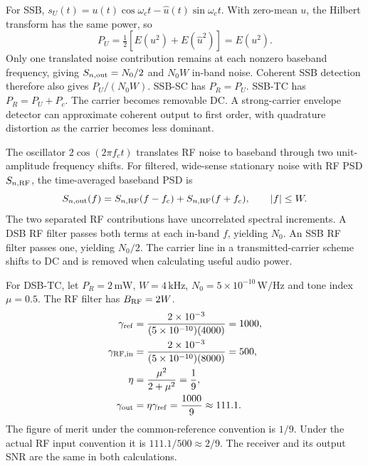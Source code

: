 \documentclass[12pt,a4paper]{article}
\begin{document}
For SSB, $s_U(t)=u(t)\cos\omega_ct-\widehat u(t)\sin\omega_ct$. With zero-mean $u$, the Hilbert transform has the same power, so
\[
 P_U=\tfrac12[E(u^2)+E(\widehat u^2)]=E(u^2).
\]
Only one translated noise contribution remains at each nonzero baseband frequency, giving $S_{n,\rm out}=N_0/2$ and $N_0W$ in-band noise. Coherent SSB detection therefore also gives $P_U/(N_0W)$. SSB-SC has $P_R=P_U$. SSB-TC has $P_R=P_U+P_c$. The carrier becomes removable DC. A strong-carrier envelope detector can approximate coherent output to first order, with quadrature distortion as the carrier becomes less dominant.

\begin{tcolorbox}[formulabox, title={Track the RF Noise through the Product Detector}]
The oscillator $2\cos(2\pi f_ct)$ translates RF noise to baseband through two unit-amplitude frequency shifts. For filtered, wide-sense stationary noise with RF PSD $S_{n,\rm RF}$, the time-averaged baseband PSD is
\[
 S_{n,\rm out}(f)=S_{n,\rm RF}(f-f_c)+S_{n,\rm RF}(f+f_c),
 \qquad |f|\le W .
\]
The two separated RF contributions have uncorrelated spectral increments. A DSB RF filter passes both terms at each in-band $f$, yielding $N_0$. An SSB RF filter passes one, yielding $N_0/2$. The carrier line in a transmitted-carrier scheme shifts to DC and is removed when calculating useful audio power.
\end{tcolorbox}

\begin{tcolorbox}[examplebox, title={Keep Reference SNR and RF Input SNR Separate}]
For DSB-TC, let $P_R=2\,\mathrm{mW}$, $W=4\,\mathrm{kHz}$, $N_0=5\times10^{-10}\,\mathrm{W/Hz}$ and tone index $\mu=0.5$. The RF filter has $B_{\rm RF}=2W$.
\[
\begin{aligned}
 \gamma_{\rm ref} &=\frac{2\times10^{-3}}{(5\times10^{-10})(4000)}=1000,\\
 \gamma_{\rm RF,in}&=\frac{2\times10^{-3}}{(5\times10^{-10})(8000)}=500,\\
 \eta &= \frac{\mu^2}{2+\mu^2}=\frac19,\\
 \gamma_{\rm out}&=\eta\gamma_{\rm ref}=\frac{1000}{9}\approx111.1 .
\end{aligned}
\]
The figure of merit under the common-reference convention is $1/9$. Under the actual RF input convention it is $111.1/500\approx2/9$. The receiver and its output SNR are the same in both calculations.
\end{tcolorbox}
\end{document}
